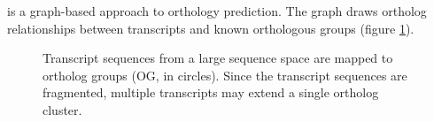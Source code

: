 \pname is a graph-based approach to orthology prediction. The graph draws
ortholog relationships between transcripts and known orthologous groups (figure
\ref{fig:graph}).

\begin{figure}[ht]
	\centering
	\def\svgwidth{0.8\textwidth}
	
	\caption[Graph-based approach to orthology prediction]{
		Transcript sequences from a large sequence space are mapped to ortholog
		groups (OG, in circles). Since the transcript sequences are fragmented, multiple
		transcripts may extend a single ortholog cluster.
	}
	\label{fig:graph}
\end{figure}


